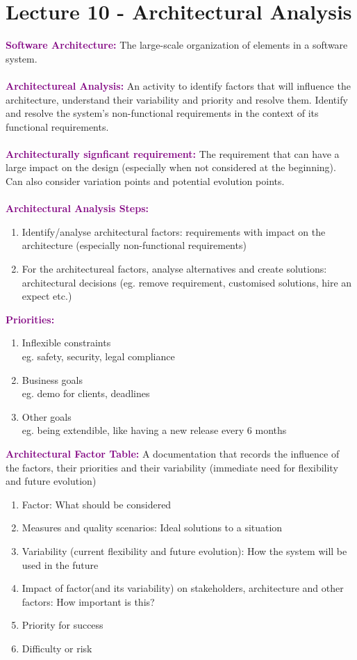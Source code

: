 \documentclass[a4paper,10pt]{article}
\begin{document}
\section*{Lecture 10 - Architectural Analysis}
\textcolor{Purple}{\textbf{Software Architecture:}} The large-scale organization of elements in a software system. \\\\
\textcolor{Purple}{\textbf{Architectureal Analysis:}} An activity to identify factors that will influence the architecture, understand their variability and priority and resolve them. Identify and resolve the system's non-functional requirements in the context of its functional requirements.\\\\
\textcolor{Purple}{\textbf{Architecturally signficant requirement:}} The requirement that can have a large impact on the design (especially when not considered at the beginning). Can also consider variation points and potential evolution points.\\\\
\textcolor{Purple}{\textbf{Architectural Analysis Steps:}}
\begin{enumerate}
\item Identify/analyse architectural factors: requirements with impact on the architecture (especially non-functional requirements)
\item For the architectureal factors, analyse alternatives and create solutions: architectural decisions (eg. remove requirement, customised solutions, hire an expect etc.)
\end{enumerate}
\textcolor{Purple}{\textbf{Priorities:}} 
\begin{enumerate}
\item Inflexible constraints \\ 
eg. safety, security, legal compliance
\item Business goals \\
eg. demo for clients, deadlines
\item Other goals \\
eg. being extendible, like having a new release every 6 months 
\end{enumerate}
\textcolor{Purple}{\textbf{Architectural Factor Table:}} A documentation that records the influence of the factors, their priorities and their variability (immediate need for flexibility and future evolution)
\begin{enumerate}
\item Factor: What should be considered 
\item Measures and quality scenarios: Ideal solutions to a situation 
\item Variability (current flexibility and future evolution): How the system will be used in the future 
\item Impact of factor(and its variability) on stakeholders, architecture and other factors: How important is this?
\item Priority for success 
\item Difficulty or risk 
\end{enumerate}
\end{document}
